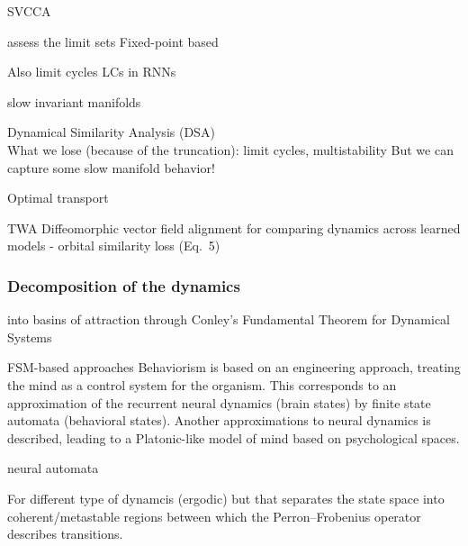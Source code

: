 \documentclass{article}
\theoremstyle{definition} \newtheorem{definition}{Definition}  \newtheorem{example}{Example}
\theoremstyle{remark} \newtheorem{remark}{Remark}
\newcounter{ct}
\begin{document}
\citep{mezic2004comparison}
SVCCA\citep{raghu2017svcca}

assess the limit sets
Fixed-point based \citep{sussillo2013blackbox,katz2017fibers,golub2018fixedpointfinder}

Also limit cycles 
LCs in RNNs \citep{townley2000existence} \citep{pals2024inferring}

slow invariant manifolds\citep{Sagodi2024a}


Dynamical Similarity Analysis (DSA) \citep{ostrow2024beyond} \citep{kamiya2024koopman}\\
What we lose (because of the truncation): limit cycles, multistability
But we can capture some slow manifold behavior!

\citep{libedinsky2023comparing}
\citep{lipshutz2024disentangling} 
\citep{nejatbakhsh2024comparing} Optimal transport
\citep{barbosa2025quantifying} %

TWA\citep{moriel2024timewarpattend}
Diffeomorphic vector field alignment for comparing dynamics across learned models\citep{chen2024dform}
- orbital similarity loss (Eq.~5)


\subsubsection{Decomposition of the dynamics}\label{sec:decomposition}
into basins of attraction through Conley’s Fundamental Theorem for Dynamical Systems \citep{conley1978morse, norton1995fundamental,mischaikow1999cit}

FSM-based approaches\citep{pollack1991induction, casey1996dynamics, jacobsson2005ruleextraction, ashwin2021excitable, oliva2019fsm, cotteret2024fsm}
Behaviorism is based on an engineering approach, treating the mind as a control system for the organism. This corresponds to an approximation of the recurrent neural dynamics (brain states) by finite state automata (behavioral states). Another approximations to neural dynamics is described, leading to a Platonic-like model of mind based on psychological spaces. \citep{duch1998platonic}

neural automata\citep{goles2013neural, uria2024invariants}

For different type of dynamcis (ergodic) but that separates the state space into coherent/metastable regions between which the Perron–Frobenius operator describes transitions.
\end{document}

